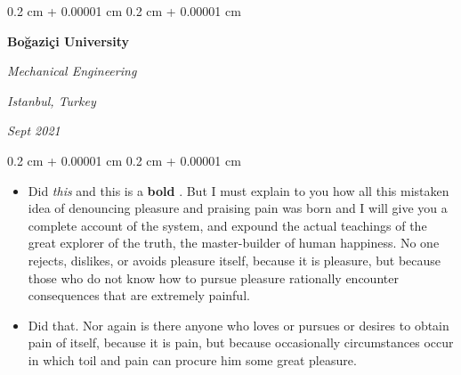 \documentclass[10pt, letterpaper]{article}
\newenvironment{highlights}{
    \begin{itemize}[
        topsep=0.10 cm,
        parsep=0.10 cm,
        partopsep=0pt,
        itemsep=0pt,
        leftmargin=0.4 cm + 10pt
    ]
}{
    \end{itemize}
} %
\newenvironment{onecolentry}{
    \begin{adjustwidth}{
        0.2 cm + 0.00001 cm
    }{
        0.2 cm + 0.00001 cm
    }
}{
    \end{adjustwidth}
} %
\newenvironment{twocolentry}[2][]{
    \onecolentry
    \def\secondColumn{#2}
    \setcolumnwidth{\fill, 4.5 cm}
    \begin{paracol}{2}
}{
    \switchcolumn \raggedleft \secondColumn
    \end{paracol}
    \endonecolentry
} %
\let\hrefWithoutArrow\href
\renewcommand{\href}[2]{\hrefWithoutArrow{#1}{\ifthenelse{\equal{#2}{}}{ }{#2 }\raisebox{.15ex}{\footnotesize \faExternalLink*}}}
\begin{document}
        \begin{twocolentry}{
        \textit{Istanbul, Turkey}    
            
        \textit{Sept 2021}}
            \textbf{Boğaziçi University}

            \textit{Mechanical Engineering}
        \end{twocolentry}
        \vspace{0.10 cm}
        \begin{onecolentry}
            \begin{highlights}
                \item Did \textit{this} and this is a \textbf{bold} \href{https://example.com}{link}. But I must explain to you how all this mistaken idea of denouncing pleasure and praising pain was born and I will give you a complete account of the system, and expound the actual teachings of the great explorer of the truth, the master-builder of human happiness. No one rejects, dislikes, or avoids pleasure itself, because it is pleasure, but because those who do not know how to pursue pleasure rationally encounter consequences that are extremely painful.
                \item Did that. Nor again is there anyone who loves or pursues or desires to obtain pain of itself, because it is pain, but because occasionally circumstances occur in which toil and pain can procure him some great pleasure.
            \end{highlights}
        \end{onecolentry}


        \vspace{0.2 cm}
\end{document}
